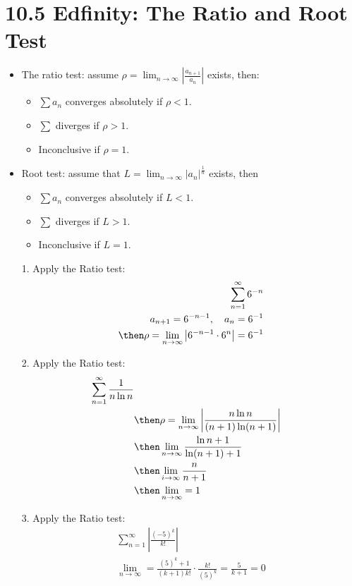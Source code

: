 \section{10.5 Edfinity: The Ratio and Root Test}
\begin{itemize}
  \item The ratio test: assume \(\displaystyle \rho = \lim_{n \to \infty}
    \left| \frac{a_{n+1}}{a_n} \right| \) exists, then:
    \begin{itemize}
      \item \(\sum a_n\) converges absolutely if \(\rho < 1\).
      \item \(\sum\) diverges if \(\rho > 1\).
      \item Inconclusive if \(\rho = 1\).
    \end{itemize}
  \item Root test: assume that \(\displaystyle L = \lim_{n \to \infty} \left|
    a_n \right|^{\frac{1}{n}}\) exists, then
    \begin{itemize}
      \item \(\sum a_n\) converges absolutely if \(L < 1\).
      \item \(\sum\) diverges if \(L > 1\).
      \item Inconclusive if \(L = 1\).
    \end{itemize}

  \item[1.] Apply the Ratio test:
  \begin{align*}
    \sum_{n=1}^{\infty} 6^{-n}\\
    a_{n+1} = 6^{-n-1}, \quad a_n = 6^{-1} \\
    \then \rho = \lim_{n \to \infty} \left|  6^{-n-1}  \cdot 6^{n} \right| = 6^{-1}
  \end{align*}

  \item[2.] Apply the Ratio test:
  \begin{align*}
    \sum_{n=1}^{\infty} \frac{1}{n\ln n} \\
    &\then \rho = \lim_{n \to \infty}
    \left| \frac{n \ln  n}{(n+1) \ln (n+1)} \right| \\
    &\then \lim_{n \to \infty} \frac{\ln n + 1}{\ln (n+1)+1} \\
    &\then \lim_{i \to \infty} \frac{n}{n+1} \\
    &\then \lim_{n \to \infty} = 1
  \end{align*}

  \item[3.] Apply the Ratio test:
    \begin{align*}
      \sum_{n=1}^{\infty} \left|\frac{(-5)^k}{k!} \right| \\
      \lim_{n \to \infty} = \frac{(5)^k+1}{(k+1)k!} \cdot \frac{k!}{(5)^k} =
      \frac{5}{k+1} = 0
    \end{align*}


\end{itemize}
